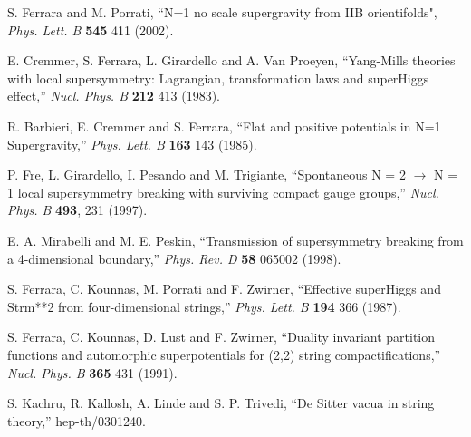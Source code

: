 \documentclass[a4paper,12pt]{article}
\begin{document}
\begin{thebibliography}{99}
 S. Ferrara and M. Porrati, ``N=1 no scale
supergravity from IIB orientifolds", {\it Phys. Lett. B} {\bf 545}
411 (2002).

E. Cremmer, S. Ferrara, L. Girardello and A. Van Proeyen,
``Yang-Mills theories with local supersymmetry: Lagrangian,
transformation laws and superHiggs effect,'' {\it Nucl. Phys. B}
{\bf 212} 413 (1983).

 R. Barbieri, E. Cremmer and S. Ferrara,
``Flat and positive potentials in N=1 Supergravity,'' {\it Phys.
Lett. B} {\bf 163} 143 (1985).

P. Fre, L. Girardello, I. Pesando and M. Trigiante,
``Spontaneous N = 2 $\to$ N = 1 local supersymmetry breaking with
surviving  compact gauge groups,'' {\it Nucl.  Phys.  B} {\bf
493}, 231 (1997).

E. A. Mirabelli and M. E. Peskin, ``Transmission of supersymmetry
breaking from a 4-dimensional boundary,'' {\it Phys. Rev. D} {\bf
58} 065002 (1998).


S. Ferrara, C. Kounnas, M. Porrati and F. Zwirner, ``Effective
superHiggs and Strm**2 from four-dimensional strings,'' {\it Phys.
Lett. B} {\bf 194} 366 (1987).



S. Ferrara, C. Kounnas, D. Lust and F. Zwirner, ``Duality
invariant partition functions and automorphic superpotentials for
(2,2) string compactifications,'' {\it Nucl.  Phys.  B} {\bf 365}
431 (1991).

S. Kachru, R. Kallosh, A. Linde and S. P. Trivedi, ``De Sitter
vacua in string theory,'' hep-th/0301240.



















\end{thebibliography}
\end{document}
